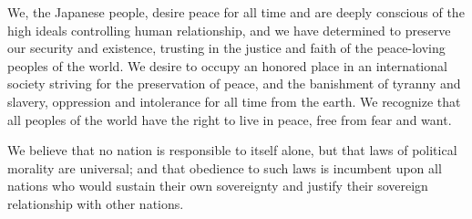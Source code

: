 \documentclass[twocolumn]{jsarticle}
\begin{document}
We, the Japanese people, desire peace for all time and are deeply conscious of the high ideals controlling human relationship, and we have determined to preserve our security and existence, trusting in the justice and faith of the peace-loving peoples of the world. We desire to occupy an honored place in an international society striving for the preservation of peace, and the banishment of tyranny and slavery, oppression and intolerance for all time from the earth. We recognize that all peoples of the world have the right to live in peace, free from fear and want.

We believe that no nation is responsible to itself alone, but that laws of political morality are universal; and that obedience to such laws is incumbent upon all nations who would sustain their own sovereignty and justify their sovereign relationship with other nations.
\end{document}
